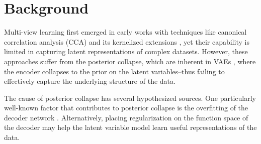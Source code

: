 

\vspace{-0.05in}
\section{Background}\label{sec:background}
\vspace{-0.05in}
Multi-view learning first emerged in early works with techniques like canonical correlation analysis (\MakeUppercase{cca}) \citep{hotelling1992relations} and its kernelized extensions \citep{bach2002kernel, hardoon2004canonical}, yet their capability is limited in capturing latent representations of complex datasets.  However, these approaches suffer from the posterior collapse, which are inherent in \MakeUppercase{vae}s  \citep{wang2021posterior}, where the encoder collapses to the prior on the latent variables--thus failing to effectively capture the underlying structure of the data.

The cause of posterior collapse has several hypothesized sources. %
One particularly well-known factor that contributes to posterior collapse is the overfitting of the decoder network \citep{bowman2016generating, sonderby2016ladder}. Alternatively, placing regularization on the function space of the decoder may help the latent variable model learn useful representations of the data.

\vspace{-0.12in}
